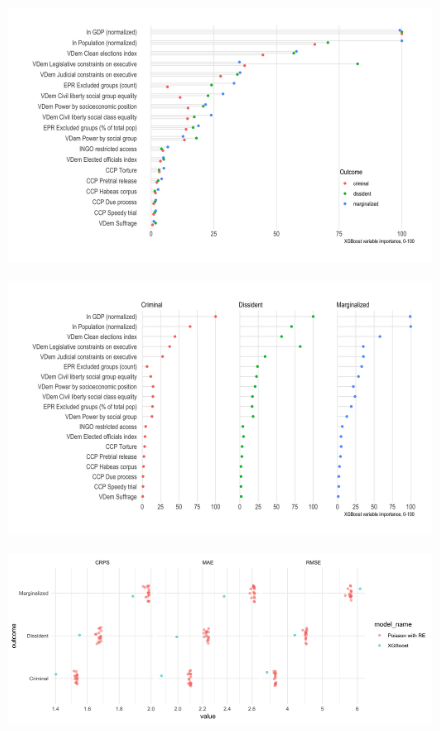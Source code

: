 \documentclass[12pt]{article}
\begin{document}
\begin{figure}
\includegraphics[width=.9\textwidth]{../output/figures/xgboost-variable-importance-v1.png}
\end{figure}

\begin{figure}
\includegraphics[width=.9\textwidth]{../output/figures/xgboost-variable-importance-v2.png}
\end{figure}

\begin{figure}
\includegraphics[width=.9\textwidth]{../output/figures/oos-fit-all.png}
\end{figure}










\end{document}

